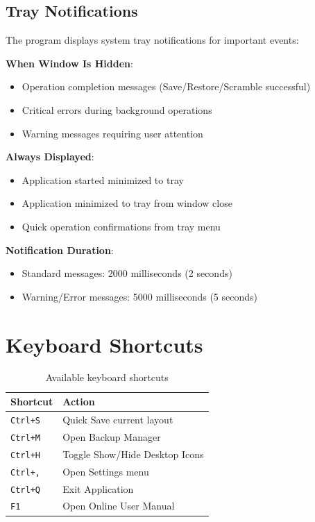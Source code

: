 \documentclass[a4paper,11pt]{article}
\begin{document}
\subsection{Tray Notifications}

The program displays system tray notifications for important events:

\textbf{When Window Is Hidden}:
\begin{itemize}
  \item Operation completion messages (Save/Restore/Scramble successful)
  \item Critical errors during background operations
  \item Warning messages requiring user attention
\end{itemize}

\textbf{Always Displayed}:
\begin{itemize}
  \item Application started minimized to tray
  \item Application minimized to tray from window close
  \item Quick operation confirmations from tray menu
\end{itemize}

\textbf{Notification Duration}:
\begin{itemize}
  \item Standard messages: 2000 milliseconds (2 seconds)
  \item Warning/Error messages: 5000 milliseconds (5 seconds)
\end{itemize}

\section{Keyboard Shortcuts}

\begin{table}[H]
  \centering
  \begin{tabular}{|l|l|}
    \hline
    \textbf{Shortcut} & \textbf{Action} \\
    \hline
    \texttt{Ctrl+S} & Quick Save current layout \\
    \hline
    \texttt{Ctrl+M} & Open Backup Manager \\
    \hline
    \texttt{Ctrl+H} & Toggle Show/Hide Desktop Icons \\
    \hline
    \texttt{Ctrl+,} & Open Settings menu \\
    \hline
    \texttt{Ctrl+Q} & Exit Application \\
    \hline
    \texttt{F1} & Open Online User Manual \\
    \hline
  \end{tabular}
  \caption{Available keyboard shortcuts}
\end{table}
\end{document}
